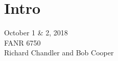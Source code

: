 \documentclass[color=usenames,dvipsnames]{beamer}\usepackage[]{graphicx}\usepackage[]{color}
\makeatletter
\newcommand{\hlnum}[1]{\textcolor[rgb]{0.69,0.494,0}{#1}}%
\newcommand{\hlstr}[1]{\textcolor[rgb]{0.749,0.012,0.012}{#1}}%
\newcommand{\hlcom}[1]{\textcolor[rgb]{0.514,0.506,0.514}{\textit{#1}}}%
\newcommand{\hlopt}[1]{\textcolor[rgb]{0,0,0}{#1}}%
\newcommand{\hlstd}[1]{\textcolor[rgb]{0,0,0}{#1}}%
\newcommand{\hlkwb}[1]{\textcolor[rgb]{0,0.341,0.682}{#1}}%
\newcommand{\hlkwc}[1]{\textcolor[rgb]{0,0,0}{\textbf{#1}}}%
\newcommand{\hlkwd}[1]{\textcolor[rgb]{0.004,0.004,0.506}{#1}}%
\newenvironment{kframe}{%
 \def\at@end@of@kframe{}%
 \ifinner\ifhmode%
  \def\at@end@of@kframe{\end{minipage}}%
  \begin{minipage}{\columnwidth}%
 \fi\fi%
 \def\FrameCommand##1{\hskip\@totalleftmargin \hskip-\fboxsep
 \colorbox{shadecolor}{##1}\hskip-\fboxsep
     \hskip-\linewidth \hskip-\@totalleftmargin \hskip\columnwidth}%
 \MakeFramed {\advance\hsize-\width
   \@totalleftmargin\z@ \linewidth\hsize
   \@setminipage}}%
 {\par\unskip\endMakeFramed%
 \at@end@of@kframe}
\newenvironment{knitrout}{}{} %
\makeatother
\begin{document}
\section{Intro}

\begin{frame}[plain]
  \LARGE
  \centering \par
  {\color{RoyalBlue}{\huge Lab 7 -- $A \times B$ Factorial Designs}} \par
  \vspace{1cm}
  \Large
  October 1 \& 2, 2018 \\
  FANR 6750 \\
  \vfill
  \large
  Richard Chandler and Bob Cooper
\end{frame}



\begin{comment}
\begin{frame}[fragile]
  \frametitle{Data}
\begin{knitrout}
\definecolor{shadecolor}{rgb}{0.878, 0.918, 0.933}\color{fgcolor}\begin{kframe}
\begin{alltt}
\hlstd{makeData} \hlkwb{<-} \hlkwd{data.frame}\hlstd{(}\hlkwc{precip}\hlstd{=}\hlkwd{rep}\hlstd{(}\hlkwd{c}\hlstd{(}\hlstr{"Wet"}\hlstd{,} \hlstr{"Dry"}\hlstd{),} \hlkwc{each}\hlstd{=}\hlnum{24}\hlstd{),}
                       \hlkwc{temp}\hlstd{=}\hlkwd{rep}\hlstd{(}\hlkwd{c}\hlstd{(}\hlstr{"Cold"}\hlstd{,} \hlstr{"Hot"}\hlstd{),} \hlkwc{times}\hlstd{=}\hlnum{24}\hlstd{))}
\hlstd{X} \hlkwb{<-} \hlkwd{model.matrix}\hlstd{(}\hlopt{~}\hlstd{precip}\hlopt{*}\hlstd{temp, makeData)} \hlcom{#~forest*season, makeData)}
\hlstd{E} \hlkwb{<-} \hlstd{X} \hlopt{%*%} \hlkwd{c}\hlstd{(}\hlnum{20}\hlstd{,} \hlnum{3}\hlstd{,} \hlopt{-}\hlnum{3}\hlstd{,} \hlopt{-}\hlnum{10}\hlstd{)}
\hlkwd{set.seed}\hlstd{(}\hlnum{3440}\hlstd{)}
\hlstd{species} \hlkwb{<-} \hlkwd{round}\hlstd{(}\hlkwd{rnorm}\hlstd{(}\hlkwd{nrow}\hlstd{(X), E,} \hlkwc{sd}\hlstd{=}\hlnum{2}\hlstd{))}
\hlstd{species}
\end{alltt}
\begin{verbatim}
##  [1] 27  9 23 10 21 12 28  8 23 11 20 10 24 12 21 12 26  8 22 10 21 11 25
## [24]  9 17 18 25 15 15 16 21 22 21 17 20 17 19 18 21 17 19 20 21 18 19 15
## [47] 21 17
\end{verbatim}
\begin{alltt}
\hlstd{richness} \hlkwb{<-} \hlkwd{data.frame}\hlstd{(species, makeData)}
\hlkwd{summary}\hlstd{(}\hlkwd{aov}\hlstd{(species} \hlopt{~} \hlstd{precip}\hlopt{*}\hlstd{temp, richness))}

\end{comment}
\end{document}
